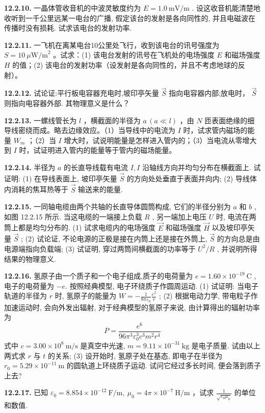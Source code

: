 \vfill
\newpage

\textbf{12.2.10.} 一晶体管收音机的中波灵敏度约为 $E = 1.0\mathrm{~mV/m}$ . 设这收音机能清楚地收听到一千公里远某一电台的广播, 假定该台的发射是各向同性的, 并且电磁波在传播时没有损耗. 试求该电台的发射功率.

\vfill
\newpage

\textbf{12.2.11.} 一飞机在离某电台10公里处飞行，收到该电台的讯号强度为 $S = 10~\mu\mathrm{W/m}^2$ 。试求：(1) 该电台发射的讯号在飞机处的电场强度 $E$ 和磁场强度 $H$ 的值；(2) 该电台的发射功率（设发射是各向同性的，并且不考虑地球的反射）。

\vfill
\newpage

\textbf{12.2.12.} 试论证:平行板电容器充电时,坡印亭矢量 $\vec{S}$ 指向电容器内部;放电时， $\vec{S}$ 则指向电容器外部. 其物理意义是什么？

\vfill
\newpage

\textbf{12.2.13.} 一螺线管长为 $l$ ，横截面的半径为 $a\,(a \ll l)$ ，由 $N$ 匝表面绝缘的细导线密绕而成。略去边缘效应。（1）当导线中的电流为 $I$ 时，试求管内磁场的能量 $W_{m}$ ；（2）当 $I$ 增大时，试说明能量是怎样进入管内的；（3）当电流从零增大到 $I$ 时，试证明进入管内的能量等于管内的磁场能量。

\vfill
\newpage

\textbf{12.2.14.} 半径为 $a$ 的长直导线载有电流 $I, I$ 沿轴线方向并均匀分布在横截面上. 试证明: (1) 在导线表面上, 坡印亭矢量 $\vec{S}$ 的方向处处垂直于表面并向内; (2) 导线体内消耗的焦耳热等于 $\vec{S}$ 输送来的能量.

\vfill
\newpage

\textbf{12.2.15.} 一同轴电缆由两个共轴的长直导体圆筒构成, 它们的半径分别为 $a$ 和 $b$ , 如图 12.2.15 所示. 当这电缆的一端接上负载 $R$ , 另一端加上电压 $U$ 时, 电流在两筒上都是均匀分布的. (1) 试求电缆内的电场强度 $\vec{E}$ 和磁场强度 $\vec{H}$ 以及坡印亭矢量 $\vec{S}$ ; (2) 试论证, 不论电源的正极是接在内筒上还是接在外筒上, $\vec{S}$ 的方向总是由电源端指向负载端; (3) 试证明, 穿过两筒间横截面的功率等于 $U^2 / R$ , 并说明所得结果的物理意义.

\begin{center}
\end{center}

\vfill
\newpage

\textbf{12.2.16.} 氢原子由一个质子和一个电子组成,质子的电荷量为 $e = 1.60 \times 10^{-19}\mathrm{~C}$ , 电子的电荷量为 $-e$. 按照经典模型, 电子环绕质子作圆周运动. (1) 试证明: 当电子轨道的半径为 $r$ 时, 氢原子的能量为 $\displaystyle W = -\frac{1}{8\pi\varepsilon_{0}} \frac{e^{2}}{r}$ ; (2) 根据电动力学, 带电粒子作加速运动时, 会向外发出辐射, 对于经典模型的氢原子来说, 由计算得出的辐射功率为
\[
P = \frac{e^{6}}{96\pi^{3}\varepsilon_{0}^{3}c^{3}m^{2}r^{4}}
\]
式中 $c = 3.00 \times 10^{8}\mathrm{~m/s}$ 是真空中光速, $m = 9.11 \times 10^{-31}\mathrm{~kg}$ 是电子质量. 试由以上两式求 $r$ 与 $t$ 的关系; (3) 设开始时, 氢原子处在基态, 即电子在半径为 $r_{0} = 5.29 \times 10^{-11}\mathrm{~m}$ 的圆轨道上环绕质子运动. 试问它经过多长时间, 便会落到质子上去?

\vfill
\newpage

\textbf{12.2.17.} 已知 $\varepsilon_{0} = 8.854 \times 10^{-12}\mathrm{~F/m},\ \mu_{0} = 4\pi \times 10^{-7}\mathrm{~H/m}$ ，试求 $\displaystyle \frac{1}{\sqrt{\varepsilon_{0}\mu_{0}}}$ 的单位和数值.

\vfill
\newpage
